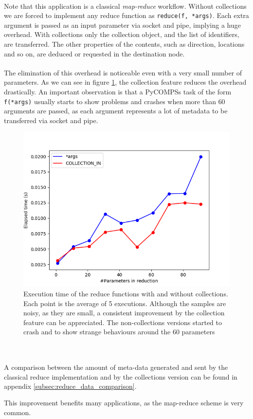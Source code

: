 \\
Note that this application is a classical \textit{map-reduce} workflow. Without collections we are forced to implement any reduce function as \verb|reduce(f, *args)|. Each extra argument is passed as an input parameter via socket and pipe, implying a huge overhead. With collections only the collection object, and the list of identifiers, are transferred. The other properties of the contents, such as direction, locations and so on, are deduced or requested in the destination node.\\
\\
The elimination of this overhead is noticeable even with a very small number of parameters. As we can see in figure \ref{fig:collection_vs_normal}, the collection feature reduces the overhead drastically. An important observation is that a PyCOMPSs task of the form \verb|f(*args)| usually starts to show problems and crashes when more than $60$ arguments are passed, as each argument represents a lot of metadata to be transferred via socket and pipe.
\begin{figure}[ht!]
\centering
\includegraphics[scale = 0.5]{figures/collection_vs_normal.png}
\caption{Execution time of the reduce functions with and without collections. Each point is the average of 5 executions. Although the samples are noisy, as they are small, a consistent improvement by the collection feature can be appreciated. The non-collections versions started to crash and to show strange behaviours around the 60 parameters}
\label{fig:collection_vs_normal}
\end{figure}\\
\\
A comparison between the amount of meta-data generated and sent by the classical reduce implementation and by the collections version can be found in appendix \ref{subsec:reduce_data_comparison}.

This improvement benefits many applications, as the map-reduce scheme is very common.
